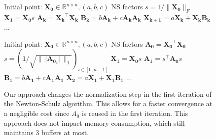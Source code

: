 \begin{figure}[t]
    \begin{minipage}[t]{0.45\textwidth}
        \begin{algorithm}[H]
            \caption{Newton-Schulz \color{muoncolor}Muon\color{black}/\color{dioncolor}Muon+\color{black}}
            \label{alg:muon}
            \begin{algorithmic}[1]
    \Require Initial point: $\mathbf{X_0} \in \mathbb{R}^{n\times n},(a,b,c)$  NS factors 
    \Statex
    \State \color{frobcolor}$s=1/\|\mathbf{X_0}\|_F$\color{black} 
    \State $\mathbf{X_1}=\mathbf{X_0}s$  
    \State $\mathbf{A_k}=\mathbf{X_k}^\top \mathbf{X_k} $
    \State $\mathbf{B_k}=b\mathbf{A_k}+ c \mathbf{A_k} \mathbf{A_k}$
    \State $\mathbf{X_{k+1}}=a\mathbf{X_k}+ \mathbf{X_k}\mathbf{B_k}$
    \Statex   ... 
    \end{algorithmic}
        \end{algorithm}
    \end{minipage}
    \hfill
    \begin{minipage}[t]{0.54\textwidth}
        \begin{algorithm}[H]
            \caption{Newton-Schulz  \color{turbomuoncolor}\turbomuon\color{black}}
            \label{alg:turbomuon}
            \begin{algorithmic}[1]
    \Require Initial point: $\mathbf{X_0} \in \mathbb{R}^{n\times n},(a,b,c)$  NS factors
    \State $\mathbf{A_0}=  \mathbf{X_0}^\top \mathbf{X_0} $ 
    \State \color{turbomuoncolor}$s=(1/\sqrt{\|\mathbf{~|A_0}_i|~\|_1})_{i\in[0,n-1]}$\color{black} 
    \State $\mathbf{X_1}=\mathbf{X_0}s$ 
    \State \color{turbomuoncolor}$\mathbf{A_1}=s^\top \mathbf{A_0} s$\color{black} 
    \State $\mathbf{B_1}=b\mathbf{A_1}+ c \mathbf{A_1} \mathbf{A_1}$
    \State $\mathbf{X_2}=a\mathbf{X_1}+ \mathbf{X_1}\mathbf{B_1}$ 
    \Statex   ... 
            \end{algorithmic}
        \end{algorithm}
    \end{minipage}
    \caption{Our approach changes the normalization step in the first iteration of the Newton-Schulz algorithm. This allows for a faster convergence at a negligible cost since $A_0$ is reused in the first iteration. This approach does not impact memory consumption, which still maintains 3 buffers at most.}
\end{figure}





